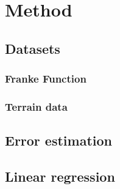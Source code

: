 \section{Method}



\subsection{Datasets}
\subsubsection{Franke Function}
\subsubsection{Terrain data}

\subsection{Error estimation}


\subsection{Linear regression}








